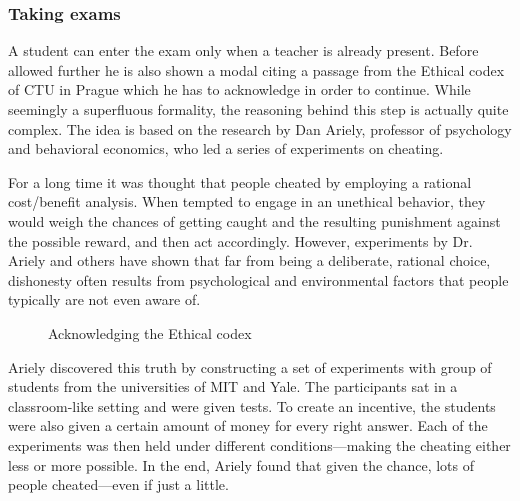 \documentclass[thesis=M,english,hidelinks]{FITthesis}[2012/10/20]
\begin{document}
      \subsubsection{Taking exams}

A student can enter the exam only when a teacher is already present. Before allowed further he is also shown a modal citing a passage from the Ethical codex of CTU in Prague which he has to acknowledge in order to continue. While seemingly a superfluous formality, the reasoning behind this step is actually quite complex. The idea is based on the research by Dan Ariely, professor of psychology and behavioral economics, who led a series of experiments on cheating.

For a long time it was thought that people cheated by employing a rational cost/benefit analysis. When tempted to engage in an unethical behavior, they would weigh the chances of getting caught and the resulting punishment against the possible reward, and then act accordingly. However, experiments by Dr. Ariely and others have shown that far from being a deliberate, rational choice, dishonesty often results from psychological and environmental factors that people typically are not even aware of.

\begin{figure}
  \setlength\fboxsep{0pt}
  \setlength\fboxrule{0.2pt}
  \caption{Acknowledging the Ethical codex}
  \label{fig:ethical-codex}
\end{figure}

Ariely discovered this truth by constructing a set of experiments with group of students from the universities of MIT and Yale. The participants sat in a classroom-like setting and were given tests. To create an incentive, the students were also given a certain amount of money for every right answer. Each of the experiments was then held under different conditions---making the cheating either less or more possible. In the end, Ariely found that given the chance, lots of people cheated---even if just a little.
\end{document}

